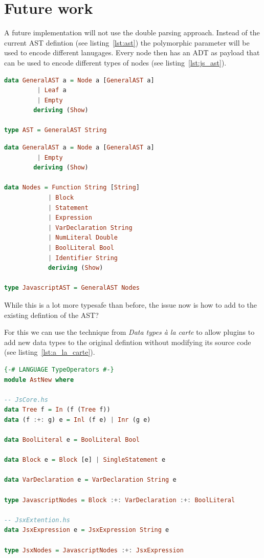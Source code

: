 \section{Future work}
\label{sec:future_work}

A future implementation will not use the double parsing approach. Instead of the current AST defintion (see listing~\ref{lst:ast}) the polymorphic parameter will be used to encode different lanugages. Every node then has an ADT as payload that can be used to encode different types of nodes (see listing~\ref{lst:js_ast}).

\begin{lstlisting}[linewidth=\columnwidth, caption={Current AST defintion}, captionpos=b, label=lst:ast, language=Haskell, breaklines=true]
data GeneralAST a = Node a [GeneralAST a]
         | Leaf a
         | Empty
        deriving (Show)

type AST = GeneralAST String
\end{lstlisting}

\begin{lstlisting}[linewidth=\columnwidth, caption={Example Javascript AST defintion}, captionpos=b, label=lst:js_ast, language=Haskell, breaklines=true]
data GeneralAST a = Node a [GeneralAST a]
         | Empty
        deriving (Show)

data Nodes = Function String [String]
            | Block
            | Statement
            | Expression
            | VarDeclaration String
            | NumLiteral Double
            | BoolLiteral Bool
            | Identifier String
            deriving (Show)

type JavascriptAST = GeneralAST Nodes
\end{lstlisting}

While this is a lot more typesafe than before, the issue now is how to add to the existing defintion of the AST?

For this we can use the technique from \textit{Data types \`a la carte} to allow plugins to add new data types to the original defintion without modifying its source code (see listing~\ref{lst:a_la_carte}).

\begin{lstlisting}[linewidth=\columnwidth, caption={Addition to sum type using type operators}, captionpos=b, label=lst:a_la_carte, language=Haskell, breaklines=true]
{-# LANGUAGE TypeOperators #-}
module AstNew where

-- JsCore.hs
data Tree f = In (f (Tree f))
data (f :+: g) e = Inl (f e) | Inr (g e)

data BoolLiteral e = BoolLiteral Bool

data Block e = Block [e] | SingleStatement e

data VarDeclaration e = VarDeclaration String e

type JavascriptNodes = Block :+: VarDeclaration :+: BoolLiteral

-- JsxExtention.hs
data JsxExpression e = JsxExpression String e

type JsxNodes = JavascriptNodes :+: JsxExpression
\end{lstlisting}

